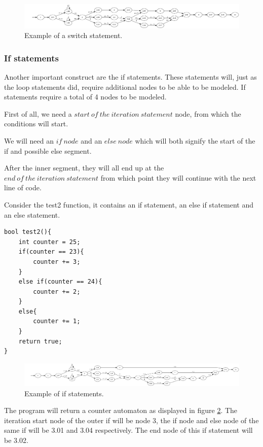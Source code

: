 \documentclass[12pt]{article}
\begin{document}
\begin{figure}[h]
	\centering
	\includegraphics[width=\linewidth]{counter_switch}
	\caption{Example of a switch statement.}
	\label{fig:counter_switch}
\end{figure}
\subsubsection{If statements}
Another important construct are the if statements. These statements will, just as the loop statements did, require additional nodes to be able to be modeled. If statements require a total of 4 nodes to be modeled.

First of all, we need a $start\ of\ the\ iteration\ statement$ node, from which the conditions will start.

We will need an $if\ node$ and an $else\ node$ which will both signify the start of the if and possible else segment.

After the inner segment, they will all end up at the $end\ of\ the\ iteration\ statement$ from which point they will continue with the next line of code.

Consider the test2 function, it contains an if statement, an else if statement and an else statement.
\begin{lstlisting}[style=CStyle]
bool test2(){
	int counter = 25;
	if(counter == 23){
		counter += 3;
	}
	else if(counter == 24){
		counter += 2;
	}
	else{
		counter += 1;
	}
	return true;
}
\end{lstlisting}

\begin{figure}[h]
	\centering
	\includegraphics[width=\linewidth]{test2_counter_automaton}
	\caption{Example of if statements.}
	\label{fig:test2_counter_automaton}
\end{figure}

The program will return a counter automaton as displayed in figure \ref{fig:test2_counter_automaton}. The iteration start node of the outer if will be node 3, the if node and else node of the same if will be 3.01 and 3.04 respectively. The end node of this if statement will be 3.02.
\end{document}
